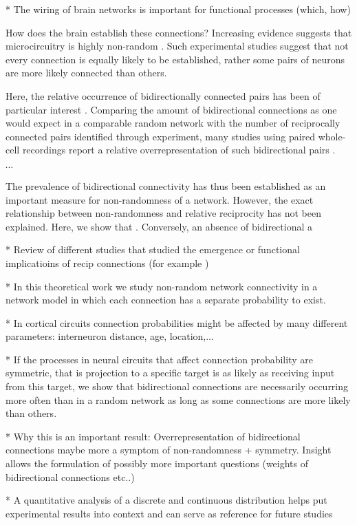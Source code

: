 
* The wiring of brain networks is important for functional processes (which, how)

How does the brain establish these connections? Increasing evidence suggests that microcircuitry is highly non-random \cite{Song2005,Perin2011}. Such experimental studies suggest that not every connection is equally likely to be established, rather some pairs of neurons are more likely connected than others.

Here, the relative occurrence of bidirectionally connected pairs has been of particular interest . Comparing the amount of bidirectional connections as one would expect in a comparable random network with the number of reciprocally connected pairs identified through experiment, many studies using paired whole-cell recordings report a relative overrepresentation of such bidirectional pairs \cite{Markram1997,Song2005}.

$\cdots$

The prevalence of bidirectional connectivity has thus been established as an important measure for non-randomness of a network. However, the exact relationship between non-randomness and relative reciprocity has not been explained. Here, we show that . Conversely, an absence of bidirectional a


* Review of different studies that studied the emergence or functional implicatioins of recip connections (for example \cite{Clopath2010})

* In this theoretical work we study non-random network connectivity in a network model in which each connection has a separate probability to exist.

* In cortical circuits connection probabilities might be affected by many different parameters: interneuron distance, age, location,...

* If the processes in neural circuits that affect connection probability are symmetric, that is projection to a specific target is as likely as receiving input from this target, we show that bidirectional connections are necessarily occurring more often than in a random network as long as some connections are more likely than others.

* Why this is an important result: Overrepresentation of bidirectional connections maybe more a symptom of non-randomness + symmetry. Insight allows the formulation of possibly more important questions (weights of bidirectional connections etc..)

* A quantitative analysis of a discrete and continuous distribution helps put experimental results into context and can serve as reference for future studies




